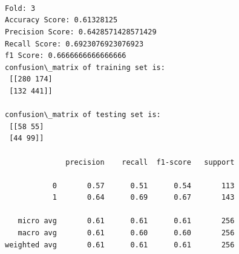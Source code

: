 \documentclass[11pt]{article}
\begin{document}
    \begin{center}
    \end{center}
    { \hspace*{\fill} \\}
    
    \begin{center}
    \end{center}
    { \hspace*{\fill} \\}
    
    \begin{Verbatim}[commandchars=\\\{\}]

Fold: 3
Accuracy Score: 0.61328125
Precision Score: 0.6428571428571429
Recall Score: 0.6923076923076923
f1 Score: 0.6666666666666666
confusion\_matrix of training set is: 
 [[280 174]
 [132 441]] 

confusion\_matrix of testing set is: 
 [[58 55]
 [44 99]] 

              precision    recall  f1-score   support

           0       0.57      0.51      0.54       113
           1       0.64      0.69      0.67       143

   micro avg       0.61      0.61      0.61       256
   macro avg       0.61      0.60      0.60       256
weighted avg       0.61      0.61      0.61       256


    \end{Verbatim}

    \begin{center}
    \end{center}
    { \hspace*{\fill} \\}
    
    \begin{center}
    \end{center}
    { \hspace*{\fill} \\}
    
\end{document}

